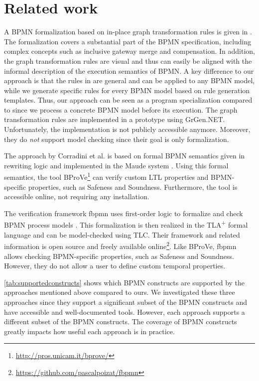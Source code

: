 \documentclass[runningheads]{llncs}
\begin{document}
\section{Related work} \label{sec:relatedWork}
A BPMN formalization based on in-place graph transformation rules is given in \cite{vangorpVisualTokenbasedFormalization2013}.
The formalization covers a substantial part of the BPMN specification, including complex concepts such as inclusive gateway merge and compensation.
In addition, the graph transformation rules are visual and thus can easily be aligned with the informal description of the execution semantics of BPMN.
A key difference to our approach is that the rules in \cite{vangorpVisualTokenbasedFormalization2013} are general and can be applied to any BPMN model, while we generate specific rules for every BPMN model based on rule generation templates.
Thus, our approach can be seen as a program specialization compared to \cite{vangorpVisualTokenbasedFormalization2013} since we process a concrete BPMN model before its execution.
The graph transformation rules are implemented in a prototype using GrGen.NET.
Unfortunately, the implementation is not publicly accessible anymore.
Moreover, they do \textit{not} support model checking since their goal is only formalization.

The approach by Corradini et al. is based on formal BPMN semantics given in rewriting logic and implemented in the Maude system \cite{corradiniFormalApproachAnalysis2021}.
Using this formal semantics, the tool BProVe\footnote{\url{http://pros.unicam.it/bprove/}} can verify custom LTL properties and BPMN-specific properties, such as Safeness and Soundness.
Furthermore, the tool is accessible online, not requiring any installation.

The verification framework \textsf{fbpmn} uses first-order logic to formalize and check BPMN process models \cite{houhouFirstOrderLogicVerification2022}.
This formalization is then realized in the TLA\textsuperscript{+} formal language and can be model-checked using TLC.
Their framework and related information is open source and freely available online\footnote{\url{https://github.com/pascalpoizat/fbpmn}}.
Like BProVe, \textsf{fbpmn} allows checking BPMN-specific properties, such as Safeness and Soundness.
However, they do not allow a user to define custom temporal properties.

\autoref{tab:supportedconstructs} shows which BPMN constructs are supported by the approaches mentioned above compared to ours.
We investigated these three approaches since they support a significant subset of the BPMN constructs and have accessible and well-documented tools.
However, each approach supports a different subset of the BPMN constructs.
The coverage of BPMN constructs greatly impacts how useful each approach is in practice.
\end{document}
